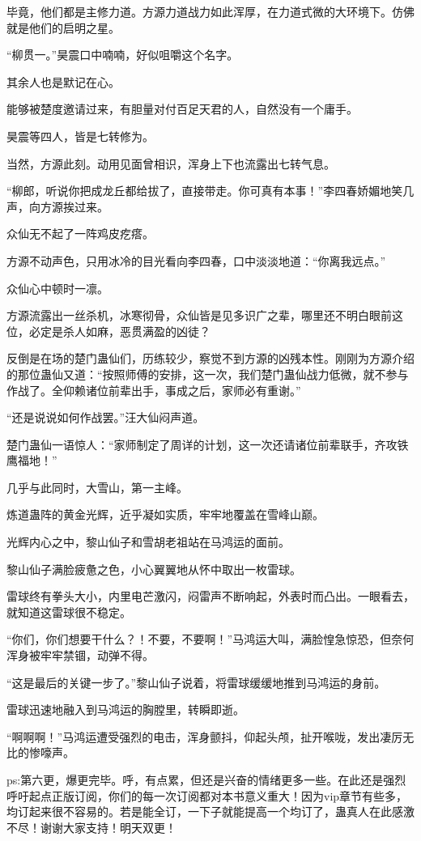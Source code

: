 \begin{this_body}
毕竟，他们都是主修力道。方源力道战力如此浑厚，在力道式微的大环境下。仿佛就是他们的启明之星。

“柳贯一。”昊震口中喃喃，好似咀嚼这个名字。

其余人也是默记在心。

能够被楚度邀请过来，有胆量对付百足天君的人，自然没有一个庸手。

昊震等四人，皆是七转修为。

当然，方源此刻。动用见面曾相识，浑身上下也流露出七转气息。

“柳郎，听说你把成龙丘都给拔了，直接带走。你可真有本事！”李四春娇媚地笑几声，向方源挨过来。

众仙无不起了一阵鸡皮疙瘩。

方源不动声色，只用冰冷的目光看向李四春，口中淡淡地道：“你离我远点。”

众仙心中顿时一凛。

方源流露出一丝杀机，冰寒彻骨，众仙皆是见多识广之辈，哪里还不明白眼前这位，必定是杀人如麻，恶贯满盈的凶徒？

反倒是在场的楚门蛊仙们，历练较少，察觉不到方源的凶残本性。刚刚为方源介绍的那位蛊仙又道：“按照师傅的安排，这一次，我们楚门蛊仙战力低微，就不参与作战了。全仰赖诸位前辈出手，事成之后，家师必有重谢。”

“还是说说如何作战罢。”汪大仙闷声道。

楚门蛊仙一语惊人：“家师制定了周详的计划，这一次还请诸位前辈联手，齐攻铁鹰福地！”

几乎与此同时，大雪山，第一主峰。

炼道蛊阵的黄金光辉，近乎凝如实质，牢牢地覆盖在雪峰山巅。

光辉内心之中，黎山仙子和雪胡老祖站在马鸿运的面前。

黎山仙子满脸疲惫之色，小心翼翼地从怀中取出一枚雷球。

雷球终有拳头大小，内里电芒激闪，闷雷声不断响起，外表时而凸出。一眼看去，就知道这雷球很不稳定。

“你们，你们想要干什么？！不要，不要啊！”马鸿运大叫，满脸惶急惊恐，但奈何浑身被牢牢禁锢，动弹不得。

“这是最后的关键一步了。”黎山仙子说着，将雷球缓缓地推到马鸿运的身前。

雷球迅速地融入到马鸿运的胸膛里，转瞬即逝。

“啊啊啊！”马鸿运遭受强烈的电击，浑身颤抖，仰起头颅，扯开喉咙，发出凄厉无比的惨嚎声。

ps:第六更，爆更完毕。呼，有点累，但还是兴奋的情绪更多一些。在此还是强烈呼吁起点正版订阅，你们的每一次订阅都对本书意义重大！因为vip章节有些多，均订起来很不容易的。若是能全订，一下子就能提高一个均订了，蛊真人在此感激不尽！谢谢大家支持！明天双更！

\end{this_body}

